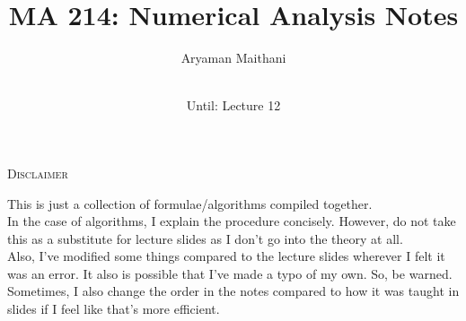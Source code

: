 \documentclass[12pt]{article}
\title{MA 214: Numerical Analysis Notes}
\author{Aryaman Maithani}
\date{\DTMnow\\
Until: Lecture 12}
\theoremstyle{definition}
\begin{document}
\maketitle
\begin{center}
	\textsc{Disclaimer}
\end{center}
This is just a collection of formulae/algorithms compiled together.\\
In the case of algorithms, I explain the procedure concisely. However, do not take this as a substitute for lecture slides as I don't go into the theory at all.\\
Also, I've modified some things compared to the lecture slides wherever I felt it was an error. It also is possible that I've made a typo of my own. So, be warned.\\
Sometimes, I also change the order in the notes compared to how it was taught in slides if I feel like that's more efficient.

\hrulefill
\end{document}

